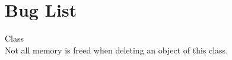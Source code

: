 \chapter{Bug List}
\hypertarget{bug}{}\label{bug}

\begin{DoxyRefList}
\item[Class \doxylink{classSomeNiceClass}{Some\+Nice\+Class} ]\hfill \\
\label{bug__bug000001}%
%
Not all memory is freed when deleting an object of this class. 
\end{DoxyRefList}